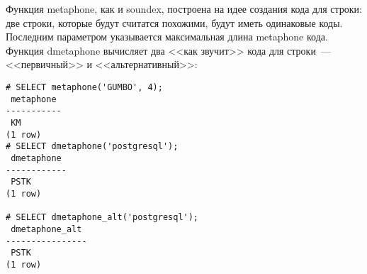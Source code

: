 Функция metaphone, как и soundex, построена на идее создания кода для строки: две строки, которые будут считатся похожими, будут иметь одинаковые коды. Последним параметром указывается максимальная длина metaphone кода. Функция dmetaphone вычисляет два <<как звучит>> кода для строки~--- <<первичный>> и <<альтернативный>>:

\begin{lstlisting}[label=lst:ext_fuzzystrmatch3,caption=metaphone]
# SELECT metaphone('GUMBO', 4);
 metaphone
-----------
 KM
(1 row)
# SELECT dmetaphone('postgresql');
 dmetaphone
------------
 PSTK
(1 row)

# SELECT dmetaphone_alt('postgresql');
 dmetaphone_alt
----------------
 PSTK
(1 row)
\end{lstlisting}

